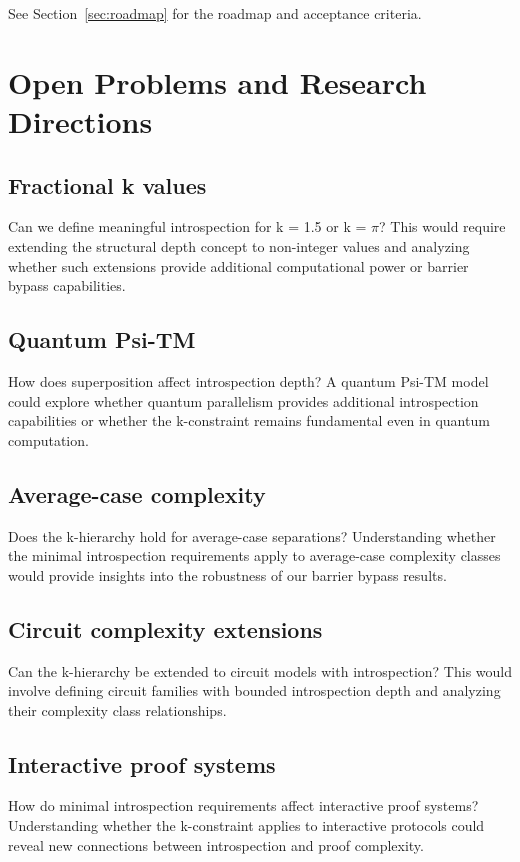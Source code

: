\documentclass[11pt]{article}
\theoremstyle{plain}
\theoremstyle{definition}
\begin{document}
See Section~\ref{sec:roadmap} for the roadmap and acceptance criteria.

\section{Open Problems and Research Directions}

\subsection{Fractional k values}
Can we define meaningful introspection for k = 1.5 or k = $\pi$? This would require extending the structural depth concept to non-integer values and analyzing whether such extensions provide additional computational power or barrier bypass capabilities.

\subsection{Quantum Psi-TM}
How does superposition affect introspection depth? A quantum Psi-TM model could explore whether quantum parallelism provides additional introspection capabilities or whether the k-constraint remains fundamental even in quantum computation.

\subsection{Average-case complexity}
Does the k-hierarchy hold for average-case separations? Understanding whether the minimal introspection requirements apply to average-case complexity classes would provide insights into the robustness of our barrier bypass results.

\subsection{Circuit complexity extensions}
Can the k-hierarchy be extended to circuit models with introspection? This would involve defining circuit families with bounded introspection depth and analyzing their complexity class relationships.

\subsection{Interactive proof systems}
How do minimal introspection requirements affect interactive proof systems? Understanding whether the k-constraint applies to interactive protocols could reveal new connections between introspection and proof complexity.
\end{document}
